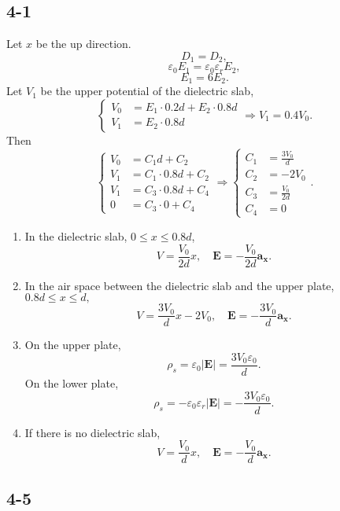 \documentclass[11pt,a4paper]{article}
\author{\href{liuyh615@sjtu.edu.cn}{Yihao Liu} (515370910207)}
\subtitle{Homework}
\begin{document}
\maketitle

\subsection{4-1}
Let $x$ be the up direction. 
$$D_1=D_2,$$
$$\varepsilon_0E_1=\varepsilon_0\varepsilon_rE_2,$$
$$E_1=6E_2.$$
Let $V_1$ be the upper potential of the dielectric slab,$$\left\{\begin{aligned}V_0&=E_1\cdot0.2d+E_2\cdot0.8d\\V_1&=E_2\cdot 0.8d\end{aligned}\right.\Longrightarrow V_1=0.4V_0.$$
Then
$$\left\{\begin{aligned}V_0&=C_1d+C_2\\V_1&=C_1\cdot 0.8d+C_2\\V_1&=C_3\cdot 0.8d + C_4\\0&=C_3\cdot 0+C_4\end{aligned}\right.\Longrightarrow\left\{\begin{aligned}C_1&=\frac{3V_0}{d}\\C_2&=-2V_0\\C_3&=\frac{V_0}{2d}\\C_4&=0\end{aligned}\right..$$
\begin{enumerate}[label=\alph*)]
\item
In the dielectric slab, $0\leqslant x\leqslant 0.8d$,
$$V=\frac{V_0}{2d}x,\quad\mathbf{E}=-\frac{V_0}{2d}\mathbf{a_x}.$$
\item
In the air space between the dielectric slab and the upper plate, $0.8d\leqslant x\leqslant d,$
$$V=\frac{3V_0}{d}x-2V_0,\quad\mathbf{E}=-\frac{3V_0}{d}\mathbf{a_x}.$$
\item
On the upper plate,
$$\rho_s=\varepsilon_0|\mathbf{E}|=\frac{3V_0\varepsilon_0}{d}.$$
On the lower plate,
$$\rho_s=-\varepsilon_0\varepsilon_r|\mathbf{E}|=-\frac{3V_0\varepsilon_0}{d}.$$
\item
If there is no dielectric slab,
$$V=\frac{V_0}{d}x,\quad \mathbf{E}=-\frac{V_0}{d}\mathbf{a_x}.$$ 
\end{enumerate}

\subsection{4-5}
\end{document}

